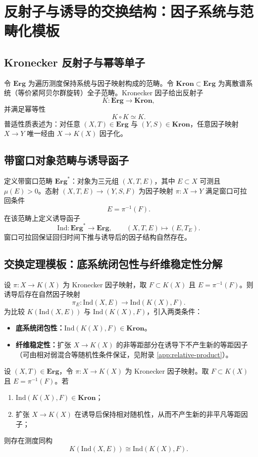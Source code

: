 \section{反射子与诱导的交换结构：因子系统与范畴化模板}

\subsection{Kronecker 反射子与幂等单子}

令 $\mathbf{Erg}$ 为遍历测度保持系统与因子映射构成的范畴。令 $\mathbf{Kron}\subset\mathbf{Erg}$ 为离散谱系统（等价紧阿贝尔群旋转）全子范畴。Kronecker 因子给出反射子
\[
K:\mathbf{Erg}\to \mathbf{Kron},
\]
并满足幂等性
\[
K\circ K\simeq K.
\]
普适性质表述为：对任意 $(X,T)\in\mathbf{Erg}$ 与 $(Y,S)\in\mathbf{Kron}$，任意因子映射 $X\to Y$ 唯一经由 $X\to K(X)$ 因子化。

\subsection{带窗口对象范畴与诱导函子}

定义带窗口范畴 $\mathbf{Erg}^{\ast}$：对象为三元组 $(X,T,E)$，其中 $E\subset X$ 可测且 $\mu(E)>0$。态射 $(X,T,E)\to(Y,S,F)$ 为因子映射 $\pi:X\to Y$ 满足窗口可拉回条件
\[
E=\pi^{-1}(F).
\]
在该范畴上定义诱导函子
\[
\mathrm{Ind}:\mathbf{Erg}^{\ast}\to\mathbf{Erg},\qquad (X,T,E)\mapsto(E,T_E).
\]
窗口可拉回保证回归时间下推与诱导后的因子结构自然存在。

\subsection{交换定理模板：底系统闭包性与纤维稳定性分解}

设 $\pi:X\to K(X)$ 为 Kronecker 因子映射，取 $F\subset K(X)$ 且 $E=\pi^{-1}(F)$。则诱导后存在自然因子映射
\[
\pi_E:\mathrm{Ind}(X,E)\to \mathrm{Ind}(K(X),F).
\]
为比较 $K(\mathrm{Ind}(X,E))$ 与 $\mathrm{Ind}(K(X),F)$，引入两类条件：
\begin{itemize}
  \item \textbf{底系统闭包性：}$\mathrm{Ind}(K(X),F)\in\mathbf{Kron}$。
  \item \textbf{纤维稳定性：}扩张 $X\to K(X)$ 的非等距部分在诱导下不产生新的等距因子（可由相对弱混合等随机性条件保证，见附录 \ref{app:relative-product}）。
\end{itemize}

\begin{theorem}[反射—诱导交换模板]\label{thm:reflector-induction-template}
设 $(X,T)\in\mathbf{Erg}$，令 $\pi:X\to K(X)$ 为 Kronecker 因子映射。取 $F\subset K(X)$ 且 $E=\pi^{-1}(F)$。若
\begin{enumerate}
  \item $\mathrm{Ind}(K(X),F)\in\mathbf{Kron}$；
  \item 扩张 $X\to K(X)$ 在诱导后保持相对随机性，从而不产生新的非平凡等距因子；
\end{enumerate}
则存在测度同构
\[
K(\mathrm{Ind}(X,E))\cong \mathrm{Ind}(K(X),F).
\]
\end{theorem}

